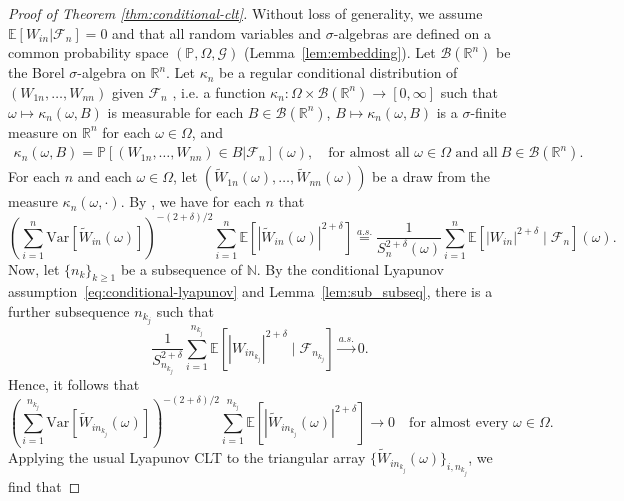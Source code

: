 \documentclass[12pt]{article}
\makeatletter
\theoremstyle{definition}
\theoremstyle{remark}
\newcommand\newtarget[2]{\Hy@raisedlink{\hypertarget{#1}{}}#2}
\newcommand{\E}{\mathbb E}								%
\newcommand{\V}{\mathrm{Var}}							%
\renewcommand{\P}{\mathbb{P}}							%
\newcommand{\R}{\mathbb{R}}								%
\newcommand{\convas}{\overset {a.s.} \rightarrow}       %
\makeatother
\begin{document}
	\begin{proof}[Proof of Theorem \ref{thm:conditional-clt}] \newtarget{proof:thm:conditional-clt}{}
		Without loss of generality, we assume $\E[W_{in}|\mathcal{F}_n]=0$ and that all random variables and $\sigma$-algebras are defined on a common probability space $(\P, \Omega, \mathcal G)$ (Lemma~\ref{lem:embedding}). Let $\mathcal B(\R^n)$ be the Borel $\sigma$-algebra on $\R^n$. Let $\kappa_{n}$ be a regular conditional distribution of $(W_{1n}, \dots, W_{nn})$ given $\mathcal{F}_{n}$ \citep[Theorem 8.37]{Lista2017}, i.e. a function $\kappa_{n}: \Omega \times \mathcal B(\R^n) \rightarrow [0,\infty]$ such that $\omega \mapsto \kappa_{n}(\omega, B)$ is measurable for each $B \in \mathcal B(\R^n)$, $B \mapsto \kappa_{n}(\omega, B)$ is a $\sigma$-finite measure on $\R^n$ for each $\omega \in \Omega$, and 
		\begin{align*}
			\kappa_{n}(\omega, B) = \P[(W_{1n}, \dots, W_{nn})\in B|\mathcal{F}_{n}](\omega), \quad \text{for almost all } \omega \in \Omega \text{ and all} \ B \in \mathcal B(\R^n).
		\end{align*}
		For each $n$ and each $\omega \in \Omega$, let $(\widetilde W_{1n}(\omega), \dots, \widetilde W_{nn}(\omega))$ be a draw from the measure $\kappa_n(\omega,\cdot)$. By \citet[Theorem 8.38]{Lista2017}, we have for each $n$ that
		\begin{equation*}
			\left(\sum_{i = 1}^n \V[\widetilde W_{in}(\omega)]\right)^{-(2+\delta)/2}\sum_{i = 1}^n \E[|\widetilde W_{in}(\omega)|^{2+\delta}] \overset{a.s.}= \frac{1}{S_{n}^{2+\delta}(\omega)} \sum_{i = 1}^{n} \E[|W_{in}|^{2+\delta} \mid \mathcal{F}_{n}](\omega).
		\end{equation*}
		Now, let $\{n_k\}_{k \geq 1}$ be a subsequence of $\mathbb N$. By the conditional Lyapunov assumption~\eqref{eq:conditional-lyapunov} and Lemma~\ref{lem:sub_subseq}, there is a further subsequence $n_{k_j}$ such that
		\begin{equation}
			\frac{1}{S_{n_{k_j}}^{2+\delta}} \sum_{i = 1}^{n_{k_j}} \E[|W_{in_{k_j}}|^{2+\delta} \mid \mathcal{F}_{n_{k_j}}] \convas 0.
		\end{equation}
		Hence, it follows that 
		\begin{equation}
			\left(\sum_{i = 1}^{n_{k_j}} \V[\widetilde W_{in_{k_j}}(\omega)]\right)^{-(2+\delta)/2}\sum_{i = 1}^{n_{k_j}} \E[|\widetilde W_{i{n_{k_j}}}(\omega)|^{2+\delta}] \rightarrow 0 \quad \text{for almost every } \omega \in \Omega.
		\end{equation}
		Applying the usual Lyapunov CLT to the triangular array $\{\widetilde W_{in_{k_j}}(\omega)\}_{i,n_{k_j}}$, we find that

\end{proof}
\end{document}
